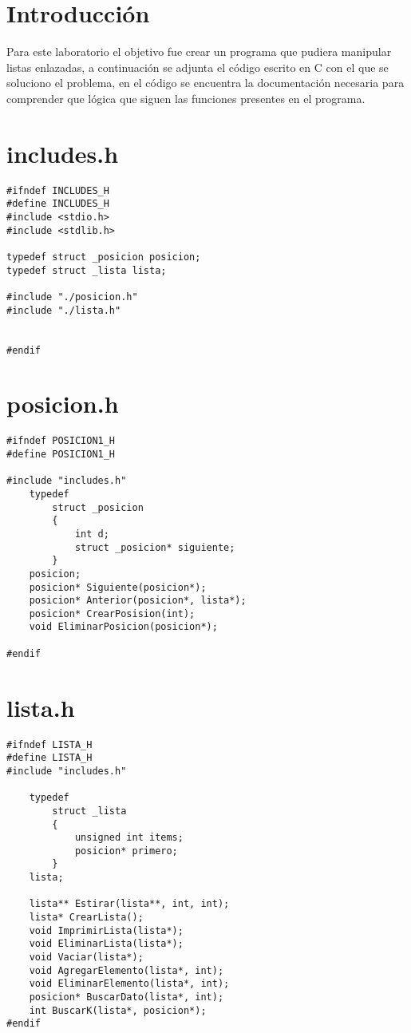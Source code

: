 \tableofcontents
\listoffigures
\newpage
\section{Introducción}
Para este laboratorio el objetivo fue crear un programa que pudiera manipular listas enlazadas, a continuación se adjunta el código escrito en C con el que se  soluciono el problema, en el código se encuentra la documentación necesaria para comprender que lógica que siguen las funciones presentes en el programa.
\newpage
\section{includes.h}

\begin{verbatim} 
#ifndef INCLUDES_H
#define INCLUDES_H
#include <stdio.h>
#include <stdlib.h>

typedef struct _posicion posicion;
typedef struct _lista lista;

#include "./posicion.h"
#include "./lista.h"


#endif
\end{verbatim}  

\newpage
\section{posicion.h}

\begin{verbatim} 
#ifndef POSICION1_H 
#define POSICION1_H 

#include "includes.h"
    typedef
        struct _posicion
        {
            int d;
            struct _posicion* siguiente;
        } 
    posicion;
    posicion* Siguiente(posicion*);
    posicion* Anterior(posicion*, lista*);
    posicion* CrearPosision(int);
    void EliminarPosicion(posicion*);

#endif 
\end{verbatim} 
\newpage
\section{lista.h}

\begin{verbatim} 
#ifndef LISTA_H 
#define LISTA_H 
#include "includes.h"

    typedef
        struct _lista
        {
            unsigned int items;
            posicion* primero;  
        }
    lista;
    
    lista** Estirar(lista**, int, int);
    lista* CrearLista();
    void ImprimirLista(lista*);
    void EliminarLista(lista*);
    void Vaciar(lista*);
    void AgregarElemento(lista*, int);
    void EliminarElemento(lista*, int);
    posicion* BuscarDato(lista*, int);
    int BuscarK(lista*, posicion*);
#endif 
\end{verbatim} 
\newpage
